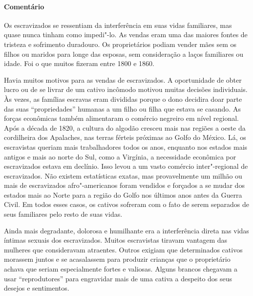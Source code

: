 \paragraph{Comentário}\quad
{\small
Os escravizados se ressentiam da interferência em suas vidas
familiares, mas quase nunca tinham como impedi"-lo. As vendas eram uma
das maiores fontes de tristeza e sofrimento duradouro. Os proprietários
podiam vender mães sem os filhos ou maridos para longe das esposas, sem
consideração a laços familiares ou idade. Foi o que muitos fizeram entre
1800 e 1860.

Havia muitos motivos para as vendas de escravizados. A oportunidade de
obter lucro ou de se livrar de um cativo incômodo motivou muitas
decisões individuais. Às vezes, as famílias escravas eram divididas
porque o dono decidira doar parte das suas ``propriedades'' humanas a um
filho ou filha que estava se casando. As forças econômicas também
alimentaram o comércio negreiro em nível regional. Após a década de
1820, a cultura do algodão cresceu mais nas regiões a oeste da
cordilheira dos Apalaches, nas terras férteis próximas ao Golfo do
México. Lá, os escravistas queriam mais trabalhadores todos os anos, enquanto
nos estados mais antigos e mais ao norte do Sul, como a Virgínia, a
necessidade econômica por escravizados estava em declínio. Isso levou a um
vasto comércio inter"-regional de escravizados. Não existem estatísticas
exatas, mas provavelmente um milhão ou mais de escravizados afro"-americanos
foram vendidos e forçados a se mudar dos estados mais ao Norte para a
região do Golfo nos últimos anos antes da Guerra Civil. Em todos esses
casos, os cativos sofreram com o fato de serem separados de seus
familiares pelo resto de suas vidas.

Ainda mais degradante, dolorosa e humilhante era a interferência
direta nas vidas íntimas sexuais dos escravizados. Muitos escravistas
tiravam vantagem das mulheres que consideravam atraentes. Outros exigiam
que determinados cativos morassem juntos e se acasalassem para produzir
crianças que o proprietário achava que seriam especialmente fortes e
valiosas. Alguns brancos chegavam a usar ``reprodutores'' para
engravidar mais de uma cativa a despeito dos seus desejos e sentimentos.

}
